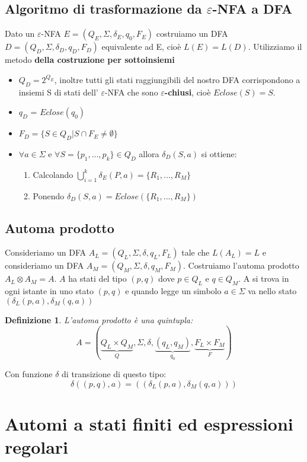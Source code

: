\documentclass[12pt]{article}
\newtheorem{Definizione}{Definizione}[subsection]
\begin{document}
\subsection{Algoritmo di trasformazione da $\varepsilon$-NFA a DFA}
Dato un $\varepsilon$-NFA $E = (Q_E, \Sigma, \delta_E, q_0, F_E)$ costruiamo un DFA $D = (Q_D, \Sigma, \delta_D, q_D, F_D)$ equivalente ad E, cioè $L(E) = L(D)$. Utilizziamo il metodo \textbf{della costruzione per sottoinsiemi}
\begin{itemize}
    \item $Q_D = 2^{Q_E}$, inoltre tutti gli stati raggiungibili del nostro DFA corrispondono a insiemi S di stati dell' $\varepsilon$-NFA che sono \textbf{$\varepsilon$-chiusi}, cioè $Eclose(S) = S$.
    \item $q_D$ = $Eclose(q_0)$
    \item $F_D = \{S \in Q_D| S \cap F_E \neq \emptyset\}$
    \item $\forall a \in \Sigma$ e $\forall S = \{p_1, ..., p_k\} \in Q_D$ allora $\delta_D(S, a)$ si ottiene:
    \begin{enumerate}
        \item Calcolando $\bigcup_{i=1}^k \delta_E(P, a) = \{R_1, ..., R_M\}$
        \item Ponendo $\delta_D(S, a) = Eclose(\{R_1, ..., R_M \})$
    \end{enumerate}
\end{itemize}

\subsection{Automa prodotto}
Consideriamo un DFA $A_L = (Q_L, \Sigma, \delta, q_L, F_L)$ tale che $L(A_L) = L$ e consideriamo un DFA $A_M = (Q_M, \Sigma, \delta, q_M, F_M)$.
Costruiamo l'automa prodotto $A_L \otimes A_M = A$. $A$ ha stati del tipo $(p, q)$ dove $p \in Q_L$ e $q \in Q_M$. A si trova in ogni istante in uno stato $(p, q)$ e  quando legge un simbolo $a \in \Sigma$ va nello stato $(\delta_L(p, a), \delta_M(q, a))$
\begin{Definizione}
    L'automa prodotto è una quintupla:
    $$A = (\underbrace{Q_L \times Q_M}_{Q}, \Sigma, \delta, \underbrace{(q_L, q_M)}_{q_0}, \underbrace{F_L \times F_M}_F)$$
\end{Definizione}
Con funzione $\delta$ di transizione di questo tipo:
$$\delta((p,q), a) = ((\delta_L(p, a), \delta_M(q, a)))$$

\section{Automi a stati finiti ed espressioni regolari}
\end{document}

